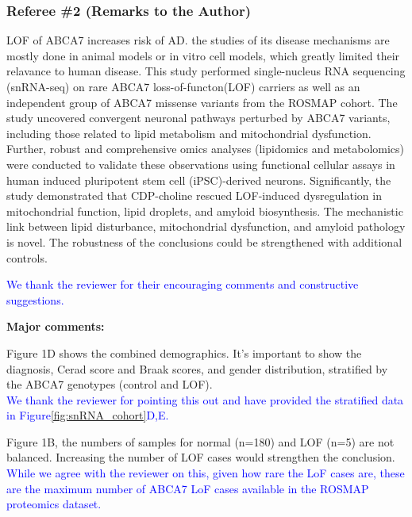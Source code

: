 \subsubsection*{Referee \#2 (Remarks to the Author)}
LOF of ABCA7 increases risk of AD. the studies of its disease mechanisms are mostly done in animal models or in vitro cell models, which greatly limited their relavance to human disease. This study performed single-nucleus RNA sequencing (snRNA-seq) on rare ABCA7 loss-of-functon(LOF) carriers as well as an independent group of ABCA7 missense variants from the ROSMAP cohort. The study uncovered convergent neuronal pathways perturbed by ABCA7 variants, including those related to lipid metabolism and mitochondrial dysfunction. Further, robust and comprehensive omics analyses (lipidomics and metabolomics) were conducted to validate these observations using functional cellular assays in human induced pluripotent stem cell (iPSC)-derived neurons. Significantly, the study demonstrated that CDP-choline rescued LOF-induced dysregulation in mitochondrial function, lipid droplets, and amyloid biosynthesis. The mechanistic link between lipid disturbance, mitochondrial dysfunction, and amyloid pathology is novel. The robustness of the conclusions could be strengthened with additional controls.

\textcolor{blue}{We thank the reviewer for their encouraging comments and constructive suggestions.}

\textbf{Major comments:}

Figure 1D shows the combined demographics. It’s important to show the diagnosis, Cerad score and Braak scores, and gender distribution, stratified by the ABCA7 genotypes (control and LOF).\\
\textcolor{blue}{We thank the reviewer for pointing this out and have provided the stratified data in Figure\ref{fig:snRNA_cohort}D,E.}

Figure 1B, the numbers of samples for normal (n=180) and LOF (n=5) are not balanced. Increasing the number of LOF cases would strengthen the conclusion.\\
\textcolor{blue}{While we agree with the reviewer on this, given how rare the LoF cases are, these are the maximum number of ABCA7 LoF cases available in the ROSMAP proteomics dataset.}

